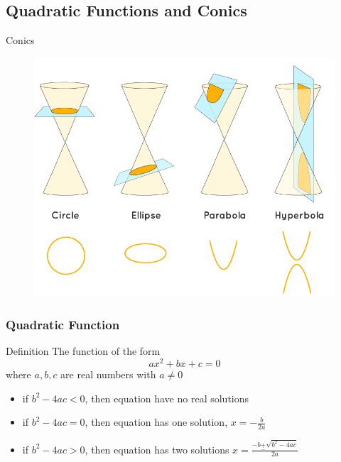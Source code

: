 \documentclass{beamer}
\begin{document}
  \subsection{Quadratic Functions and Conics}
  \begin{frame}{Conics}
    \begin{figure}
      \begin{center}
        \includegraphics[scale = 0.3]{conic-section.png}
      \end{center}
    \end{figure}
  \end{frame}
  \begin{frame}
    \frametitle{Quadratic Function}
    \begin{block}{Definition}
      The function of the form 
      \[ax^{2} + bx + c = 0\]
      where \(a,b,c\) are real numbers with \(a \neq 0\)
      \begin{itemize}
        \item if \(b^{2} - 4ac < 0\), then equation have no real solutions
        \item if \(b^{2} - 4ac = 0\), then equation has one solution, \(x = -\frac{b}{2a}\)
        \item if \(b^{2} - 4ac  > 0\), then equation has two solutions \(x = \frac{-b \underset{-}{+}\sqrt{b^{2} - 4ac}}{2a}\)
      \end{itemize}
    \end{block}
  \end{frame}
\end{document}
